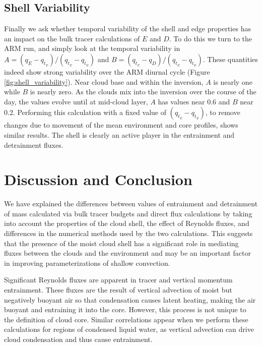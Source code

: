 \documentclass[12pt]{article}
\begin{document}

\subsection{Shell Variability}

Finally we ask whether temporal variability of the shell and edge properties 
has an impact on the bulk tracer calculations of $E$ and $D$.  To do this we 
turn to the ARM run, and simply look at the temporal variability in 
$A = (q_E - {q_t}_e)/({q_t}_c - {q_t}_e)$ and 
$B = ({q_t}_c - q_D)/({q_t}_c - {q_t}_e)$.  These quantities indeed show 
strong variability over the ARM diurnal cycle (Figure 
\ref{fig:shell_variability}).  Near cloud base and within the inversion, $A$ 
is nearly one while $B$ is nearly zero.  As the clouds mix into the inversion 
over the course of the day, the values evolve until at mid-cloud layer, $A$ 
has values near 0.6 and $B$ near 0.2.  Performing this calculation with a fixed 
value of $({q_t}_c - {q_t}_e)$, to remove changes due to movement of the mean 
environment and core profiles, shows similar results.  The shell is clearly an 
active player in the entrainment and detrainment fluxes.


\section{Discussion and Conclusion}

We have explained the differences between values of entrainment and detrainment 
of mass calculated via bulk tracer budgets and direct flux calculations by taking 
into account the properties of the cloud shell, the effect of Reynolds fluxes, 
and differences in the numerical methods used by the two calculations.  This 
suggests that the presence of the moist cloud shell has a significant role in 
mediating fluxes between the clouds and the environment and may be an important 
factor in improving parameterizations of shallow convection.

Significant Reynolds fluxes are apparent in tracer and vertical momentum 
entrainment.  These fluxes are the result of vertical advection of moist but 
negatively buoyant air so that condensation causes latent heating, making the 
air buoyant and entraining it into the core.  However, this process is not 
unique to the definition of cloud core.  Similar correlations appear when we 
perform these calculations for regions of condensed liquid water, as vertical 
advection can drive cloud condensation and thus cause entrainment.
\end{document}
